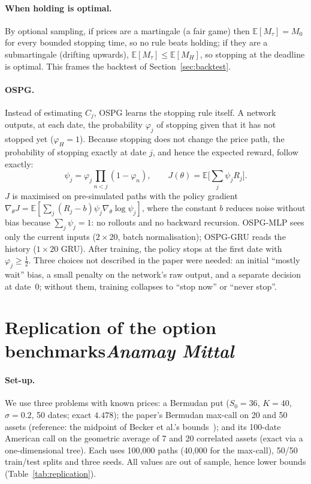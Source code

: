 \documentclass[11pt,a4paper]{article}
\newcommand{\by}[1]{\hfill{\normalfont\normalsize\itshape #1}}
\begin{document}
\paragraph{When holding is optimal.} By optional sampling, if prices are a martingale (a fair
game) then $\mathbb E[M_\tau]=M_0$ for every bounded stopping time, so no rule beats holding;
if they are a submartingale (drifting upwards), $\mathbb E[M_\tau]\le\mathbb E[M_H]$, so stopping
at the deadline is optimal. This frames the backtest of Section~\ref{sec:backtest}.

\paragraph{OSPG.} Instead of estimating $C_j$, OSPG learns the stopping rule itself. A network
outputs, at each date, the probability $\varphi_j$ of stopping given that it has not stopped yet
($\varphi_H=1$). Because stopping does not change the price path, the probability of stopping
exactly at date $j$, and hence the expected reward, follow exactly:
\[\psi_j=\varphi_j\prod_{n<j}(1-\varphi_n),\qquad J(\theta)=\mathbb E\Big[\sum_j\psi_jR_j\Big].\]
$J$ is maximised on pre-simulated paths with the policy gradient
$\nabla_\theta J=\mathbb E[\sum_j(R_j-b)\psi_j\nabla_\theta\log\psi_j]$, where the constant $b$
reduces noise without bias because $\sum_j\psi_j=1$: no rollouts and no backward recursion.
OSPG-MLP sees only the current inputs ($2\times20$, batch normalisation); OSPG-GRU reads the
history ($1\times20$ GRU). After training, the policy stops at the first date with
$\varphi_j\ge\frac12$. Three choices not described in the paper were needed: an initial
``mostly wait'' bias, a small penalty on the network's raw output, and a separate decision at
date~0; without them, training collapses to ``stop now'' or ``never stop''.

\section[Replication of the option benchmarks]{Replication of the option benchmarks\by{Anamay Mittal}}
\label{sec:replication}
\paragraph{Set-up.} We use three problems with known prices: a Bermudan put ($S_0=36$, $K=40$,
$\sigma=0.2$, 50 dates; exact $4.478$); the paper's Bermudan max-call on 20 and 50 assets
(reference: the midpoint of Becker et al.'s bounds~\cite{becker2019}); and its 100-date American
call on the geometric average of 7 and 20 correlated assets (exact via a one-dimensional tree).
Each uses 100{,}000 paths (40{,}000 for the max-call), 50/50 train/test splits and three seeds.
All values are out of sample, hence lower bounds (Table~\ref{tab:replication}).
\end{document}
